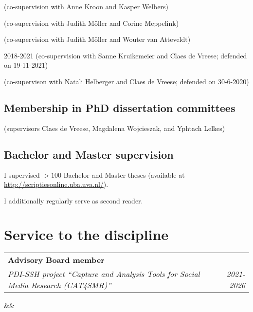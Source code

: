 \documentclass[11pt,a4paper,sans]{moderncv}
\makeatletter
\renewcommand*{\cventry}[7][.25em]{
	\begin{tabular*}{\textwidth}{p{13cm}@{\extracolsep{\fill}}r}%
		{\bfseries #4} & {\bfseries #5} \\%
		{\itshape #3\ifthenelse{\equal{#6}{}}{}{, #6}} & {\itshape #2}\\%
	\end{tabular*}%
	\ifx&#7&%
	\else{\\\vbox{\small#7}}\fi%
        \par\addvspace{#1}}
\makeatother
\begin{document}
(co-supervision with Anne Kroon and Kasper Welbers) \newline

(co-supervision with Judith M\"oller and Corine Meppelink) \newline

(co-supervision with Judith M\"oller and Wouter van Atteveldt) \newline

 {2018-2021}
(co-supervision with Sanne Kruikemeier and Claes de Vreese; defended on 19-11-2021) \newline

(co-supervison with Natali Helberger and Claes de Vreese; defended on 30-6-2020) \newline



\subsection{Membership in PhD dissertation committees}
(supervisors Claes de Vreese, Magdalena Wojcieszak, and Yphtach Lelkes) \newline

\subsection{Bachelor and Master supervision}
I supervised $>100$ Bachelor and Master theses (available at \url{http://scriptiesonline.uba.uva.nl/}). 

I additionally regularly serve as second reader.



\section{Service to the discipline}

\cventry{2021-2026}{PDI-SSH project ``Capture and Analysis Tools for Social Media Research (CAT4SMR)''}{Advisory Board member}{}{}{}
\end{document}
